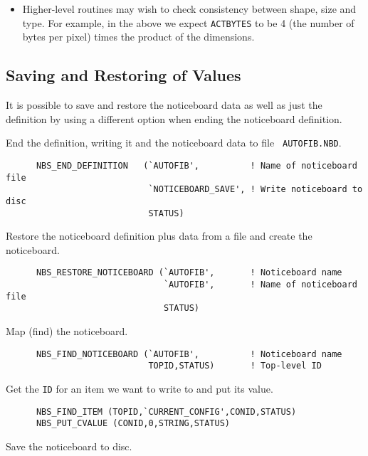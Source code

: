 \begin {itemize}
\item Higher-level routines may wish to check consistency between shape, size
and type. For example, in the above we expect {\tt ACTBYTES} to be 4 (the number
of bytes per pixel) times the product of the dimensions.
\end {itemize}

\subsection {Saving and Restoring of Values}
\label {Saving and Restoring of Values}

It is possible to save and restore the noticeboard data as well as just the
definition by using a different option when ending the noticeboard definition.

End the definition, writing it and the noticeboard data to file {\tt
AUTOFIB.NBD}.

\begin {verbatim}
      NBS_END_DEFINITION   (`AUTOFIB',          ! Name of noticeboard file
                            `NOTICEBOARD_SAVE', ! Write noticeboard to disc
                            STATUS)
\end{verbatim}

Restore the noticeboard definition plus data from a file and create the
noticeboard.

\begin {verbatim}
      NBS_RESTORE_NOTICEBOARD (`AUTOFIB',       ! Noticeboard name
                               `AUTOFIB',       ! Name of noticeboard file
                               STATUS)
\end{verbatim}

Map (find) the noticeboard.

\begin {verbatim}
      NBS_FIND_NOTICEBOARD (`AUTOFIB',          ! Noticeboard name
                            TOPID,STATUS)       ! Top-level ID
\end{verbatim}

Get the {\tt ID} for an item we want to write to and put its value.

\begin {verbatim}
      NBS_FIND_ITEM (TOPID,`CURRENT_CONFIG',CONID,STATUS)
      NBS_PUT_CVALUE (CONID,0,STRING,STATUS)
\end{verbatim}

Save the noticeboard to disc.

